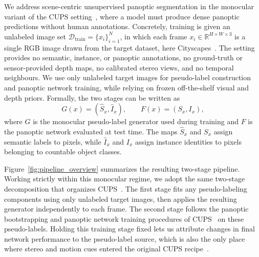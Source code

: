 \documentclass{article}
\begin{document}
We address scene-centric unsupervised panoptic segmentation in the monocular variant of the CUPS setting~\cite{hahn2025cups}, where a model must produce dense panoptic predictions without human annotations. Concretely, training is given an unlabeled image set $\mathcal{D}_{\text{train}} = \{x_i\}_{i=1}^{N}$, in which each frame $x_i \in \mathbb{R}^{H \times W \times 3}$ is a single RGB image drawn from the target dataset, here Cityscapes~\cite{cordts2016cityscapes}. The setting provides no semantic, instance, or panoptic annotations, no ground-truth or sensor-provided depth maps, no calibrated stereo views, and no temporal neighbours. We use only unlabeled target images for pseudo-label construction and panoptic network training, while relying on frozen off-the-shelf visual and depth priors. Formally, the two stages can be written as
\begin{equation}
G(x) = (\hat S_x, \hat I_x), \qquad F(x) = (S_x, I_x),
\label{eq:pipeline}
\end{equation}
where $G$ is the monocular pseudo-label generator used during training and $F$ is the panoptic network evaluated at test time. The maps $\hat S_x$ and $S_x$ assign semantic labels to pixels, while $\hat I_x$ and $I_x$ assign instance identities to pixels belonging to countable object classes.

Figure~\ref{fig:pipeline_overview} summarizes the resulting two-stage pipeline. Working strictly within this monocular regime, we adopt the same two-stage decomposition that organizes CUPS~\cite{hahn2025cups}. The first stage fits any pseudo-labeling components using only unlabeled target images, then applies the resulting generator independently to each frame. The second stage follows the panoptic bootstrapping and panoptic network training procedures of CUPS~\cite{hahn2025cups} on these pseudo-labels. Holding this training stage fixed lets us attribute changes in final network performance to the pseudo-label source, which is also the only place where stereo and motion cues entered the original CUPS recipe~\cite{hahn2025cups}.
\end{document}
